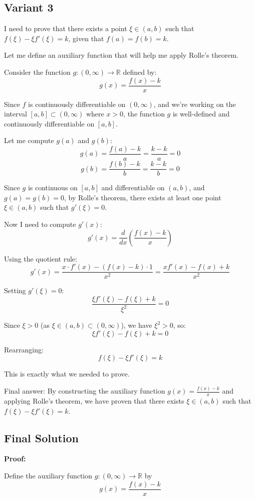\documentclass[12pt,a4paper]{article}
\theoremstyle{definition}
\begin{document}
\subsection{Variant 3}
    I need to prove that there exists a point $\xi \in (a,b)$ such that $f(\xi) - \xi f'(\xi) = k$, given that $f(a) = f(b) = k$.

    Let me define an auxiliary function that will help me apply Rolle's theorem.

    Consider the function $g:(0,\infty) \to \mathbb{R}$ defined by:
    $$g(x) = \frac{f(x) - k}{x}$$

    Since $f$ is continuously differentiable on $(0,\infty)$, and we're working on the interval $[a,b] \subset (0,\infty)$ where $x > 0$, the function $g$ is well-defined and continuously differentiable on $[a,b]$.

    Let me compute $g(a)$ and $g(b)$:
    $$g(a) = \frac{f(a) - k}{a} = \frac{k - k}{a} = 0$$
    $$g(b) = \frac{f(b) - k}{b} = \frac{k - k}{b} = 0$$

    Since $g$ is continuous on $[a,b]$ and differentiable on $(a,b)$, and $g(a) = g(b) = 0$, by Rolle's theorem, there exists at least one point $\xi \in (a,b)$ such that $g'(\xi) = 0$.

    Now I need to compute $g'(x)$:
    $$g'(x) = \frac{d}{dx}\left(\frac{f(x) - k}{x}\right)$$

    Using the quotient rule:
    $$g'(x) = \frac{x \cdot f'(x) - (f(x) - k) \cdot 1}{x^2} = \frac{xf'(x) - f(x) + k}{x^2}$$

    Setting $g'(\xi) = 0$:
    $$\frac{\xi f'(\xi) - f(\xi) + k}{\xi^2} = 0$$

    Since $\xi > 0$ (as $\xi \in (a,b) \subset (0,\infty)$), we have $\xi^2 > 0$, so:
    $$\xi f'(\xi) - f(\xi) + k = 0$$

    Rearranging:
    $$f(\xi) - \xi f'(\xi) = k$$

    This is exactly what we needed to prove.

    Final answer: By constructing the auxiliary function $g(x) = \frac{f(x) - k}{x}$ and applying Rolle's theorem, we have proven that there exists $\xi \in (a,b)$ such that $f(\xi) - \xi f'(\xi) = k$.
\subsection{Final Solution}
    \textbf{Proof:}

    Define the auxiliary function $g:(0,\infty) \to \mathbb{R}$ by
    $$g(x) = \frac{f(x) - k}{x}$$
\end{document}
